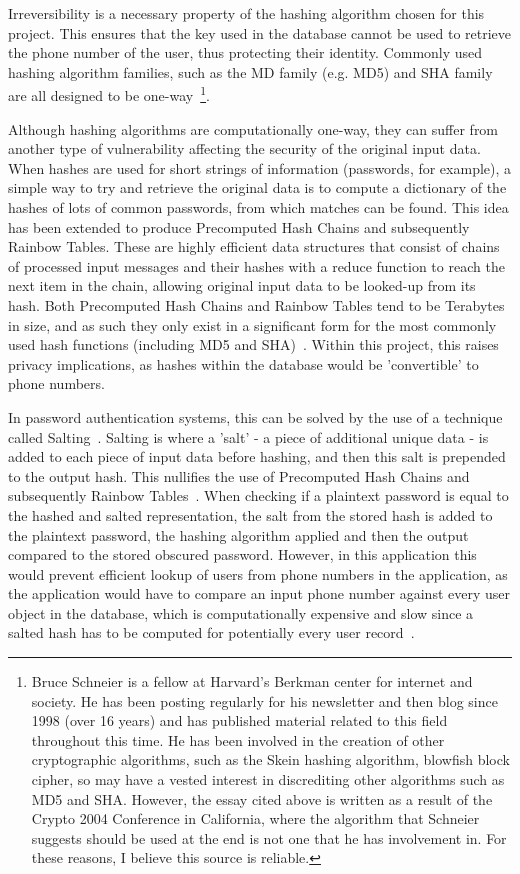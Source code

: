 \documentclass[authoryearcitations]{UoYCSproject}
\begin{document}
Irreversibility is a necessary property of the hashing algorithm chosen for this project.  This ensures that the key used in the database cannot be used to retrieve the phone number of the user, thus protecting their identity.  Commonly used hashing algorithm families, such as the MD family (e.g. MD5) and SHA family are all designed to be one-way~\cite{schneierCryptanalysisMD5SHA}\footnote{Bruce Schneier is a fellow at Harvard's Berkman center for internet and society.  He has been posting regularly for his newsletter and then blog since 1998 (over 16 years) and has published material related to this field throughout this time.  He has been involved in the creation of other cryptographic algorithms, such as the Skein hashing algorithm, blowfish block cipher, so may have a vested interest in discrediting other algorithms such as MD5 and SHA.  However, the essay cited above is written as a result of the Crypto 2004 Conference in California, where the algorithm that Schneier suggests should be used at the end is not one that he has involvement in.  For these reasons, I believe this source is reliable.}.  

Although hashing algorithms are computationally one-way, they can suffer from another type of vulnerability affecting the security of the original input data.  When hashes are used for short strings of information (passwords, for example), a simple way to try and retrieve the original data is to compute a dictionary of the hashes of lots of common passwords, from which matches can be found.  This idea has been extended to produce Precomputed Hash Chains and subsequently Rainbow Tables.  These are highly efficient data structures that consist of chains of processed input messages and their hashes with a reduce function to reach the next item in the chain, allowing original input data to be looked-up from its hash.  Both Precomputed Hash Chains and Rainbow Tables tend to be Terabytes in size, and as such they only exist in a significant form for the most commonly used hash functions (including MD5 and SHA)~\cite{Teat:2011:SCH:2016039.2016072}.  Within this project, this raises privacy implications, as hashes within the database would be 'convertible' to phone numbers.

In password authentication systems, this can be solved by the use of a technique called Salting~\cite{hashingPasswordsInfoSec}.  Salting is where a 'salt' - a piece of additional unique data - is added to each piece of input data before hashing, and then this salt is prepended to the output hash.  This nullifies the use of Precomputed Hash Chains and subsequently Rainbow Tables~\cite{hashingPasswordsInfoSec}. When checking if a plaintext password is equal to the hashed and salted representation, the salt from the stored hash is added to the plaintext password, the hashing algorithm applied and then the output compared to the stored obscured password. However, in this application this would prevent efficient lookup of users from phone numbers in the application, as the application would have to compare an input phone number against every user object in the database, which is computationally expensive and slow since a salted hash has to be computed for potentially every user record~\cite{hashingPasswordsInfoSec}.  
\end{document}
